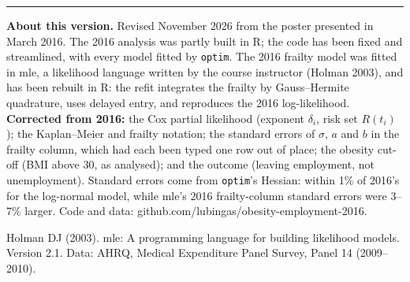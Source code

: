 \documentclass{article}
\newlength{\colw}\setlength{\colw}{18.1cm}
\begin{document}
\begin{minipage}[t]{\colw}
\vspace{0.8em}
{\color{border}\rule{\linewidth}{0.8pt}}\par
{\sffamily\fontsize{10.5}{14.5}\selectfont\color{muted}\textbf{About this version.} Revised November 2026 from the poster presented in March 2016. The 2016 analysis was partly built in R; the code has been fixed and streamlined, with every model fitted by \texttt{optim}. The 2016 frailty model was fitted in mle, a likelihood language written by the course instructor (Holman 2003), and has been rebuilt in R: the refit integrates the frailty by Gauss--Hermite quadrature, uses delayed entry, and reproduces the 2016 log-likelihood. \textbf{Corrected from 2016:} the Cox partial likelihood (exponent $\delta_i$, risk set $R(t_i)$); the Kaplan--Meier and frailty notation; the standard errors of $\sigma$, $a$ and $b$ in the frailty column, which had each been typed one row out of place; the obesity cut-off (BMI above 30, as analysed); and the outcome (leaving employment, not unemployment). Standard errors come from \texttt{optim}'s Hessian: within 1\% of 2016's for the log-normal model, while mle's 2016 frailty-column standard errors were 3--7\% larger. Code and data: github.com/lubingas/obesity-employment-2016.

Holman DJ (2003). mle: A programming language for building likelihood models. Version 2.1. Data: AHRQ, Medical Expenditure Panel Survey, Panel 14 (2009--2010).\par}
\end{minipage}
\end{document}
